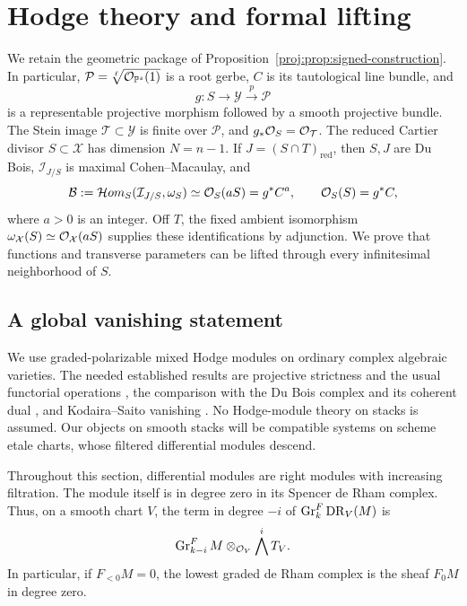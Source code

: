 \section{Hodge theory and formal lifting}\label{proj:sec:hodge}

We retain the geometric package of
Proposition~\ref{proj:prop:signed-construction}.  In particular,
\(\mathcal P=\sqrt[\ell]{\mathcal{O}_{\mathbb{P}^s}(1)}\) is a root gerbe, \(C\) is
its tautological line bundle, and
\[
 g:S\longrightarrow\mathcal Y
 \xrightarrow{p}\mathcal P
\]
is a representable projective morphism followed by a smooth projective
bundle.  The Stein image \(\mathcal T\subset\mathcal Y\) is finite over
\(\mathcal P\), and \(g_*\mathcal{O}_S=\mathcal{O}_{\mathcal T}\).  The reduced Cartier
divisor \(S\subset\mathcal X\) has dimension \(N=n-1\).  If
\(J=(S\cap T)_{\mathrm{red}}\), then \(S,J\) are Du Bois,
\(\mathcal I_{J/S}\) is maximal Cohen--Macaulay, and
\begin{equation}\label{proj:hg:geometric-lines}
 \mathcal B:=
 \mathcal Hom_S(\mathcal I_{J/S},\omega_S)
 \simeq \mathcal{O}_S(aS)=g^*C^a,
 \qquad
 \mathcal{O}_S(S)=g^*C,
\end{equation}
where \(a>0\) is an integer.  Off \(T\), the fixed ambient isomorphism
\(\omega_{\mathcal X}(S)\simeq\mathcal{O}_{\mathcal X}(aS)\) supplies these
identifications by adjunction.  We prove that functions and transverse
parameters can be lifted through every infinitesimal neighborhood of
\(S\).

\subsection{A global vanishing statement}

We use graded-polarizable mixed Hodge modules on ordinary complex
algebraic varieties.  The needed established results are projective
strictness and the usual functorial operations
\cite[Theorem~2.14 and Section~4]{Proj-Saito1990}, the comparison with the
Du Bois complex and its coherent dual
\cite[Theorem~0.2 and Corollary~0.3]{Proj-Saito2000}, and
Kodaira--Saito vanishing \cite[Proposition~2.33]{Proj-Saito1990}.
No Hodge-module theory on stacks is assumed.  Our objects on smooth
stacks will be compatible systems on scheme etale charts, whose
filtered differential modules descend.

Throughout this section, differential modules are right modules with
increasing filtration.  The module itself is in degree zero in its
Spencer de Rham complex.  Thus, on a smooth chart \(V\), the term in
degree \(-i\) of \(\operatorname{Gr}^F_k\operatorname{DR}_V(M)\) is
\[
 \operatorname{Gr}^F_{k-i}M\otimes_{\mathcal{O}_V}\bigwedge^iT_V.
\]
In particular, if \(F_{<0}M=0\), the lowest graded de Rham complex is
the sheaf \(F_0M\) in degree zero.

